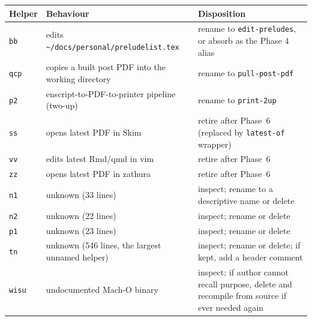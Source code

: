 \documentclass[11pt,letterpaper]{scrartcl}
\begin{document}
\begin{longtable}{@{}llp{2.5in}@{}}
  \toprule
  \textbf{Helper} & \textbf{Behaviour} & \textbf{Disposition} \\
  \midrule
  \texttt{bb}    & edits \texttt{\textasciitilde/docs/personal/preludelist.tex} & rename to \texttt{edit-preludes}, or absorb as the Phase 4 alias \\
  \texttt{qcp}   & copies a built post PDF into the working directory          & rename to \texttt{pull-post-pdf}                                  \\
  \texttt{p2}    & enscript-to-PDF-to-printer pipeline (two-up)                 & rename to \texttt{print-2up}                                      \\
  \texttt{ss}    & opens latest PDF in Skim                                     & retire after Phase~6 (replaced by \texttt{latest-of} wrapper)     \\
  \texttt{vv}    & edits latest Rmd/qmd in vim                                  & retire after Phase~6                                              \\
  \texttt{zz}    & opens latest PDF in zathura                                  & retire after Phase~6                                              \\
  \texttt{n1}    & unknown (33 lines)                                           & inspect; rename to a descriptive name or delete                   \\
  \texttt{n2}    & unknown (22 lines)                                           & inspect; rename or delete                                         \\
  \texttt{p1}    & unknown (23 lines)                                           & inspect; rename or delete                                         \\
  \texttt{tn}    & unknown (546 lines, the largest unnamed helper)              & inspect; rename or delete; if kept, add a header comment         \\
  \texttt{wisu}  & undocumented Mach-O binary                                   & inspect; if author cannot recall purpose, delete and recompile from source if ever needed again \\
  \bottomrule
\end{longtable}
\end{document}
